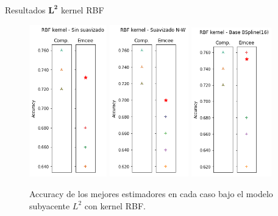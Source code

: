 \documentclass[10pt, professionalfonts]{beamer}
\begin{document}
\begin{frame}{Resultados $\boldsymbol{L^2}$ kernel RBF}
  \begin{figure}
    \includegraphics[width=0.3\textwidth]{img/results-new/clf_l2_rbf_none}\hfill
    \includegraphics[width=0.305\textwidth]{img/results-new/clf_l2_rbf_nw}\hfill
    \includegraphics[width=0.31\textwidth]{img/results-new/clf_l2_rbf_basis}
    \caption{Accuracy de los mejores estimadores en cada caso bajo el modelo subyacente $L^2$ con kernel RBF.}
  \end{figure}
\end{frame}
\end{document}
